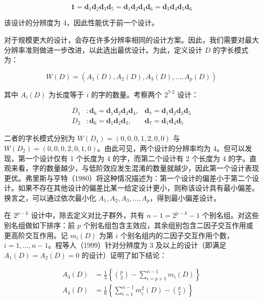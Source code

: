 \documentclass{ctexart}
\begin{document}
\begin{equation*}
\boldsymbol{1}=\boldsymbol{d}_1\boldsymbol{d}_2\boldsymbol{d}_3\boldsymbol{d}_5=\boldsymbol{d}_1\boldsymbol{d}_2\boldsymbol{d}_4\boldsymbol{d}_6=\boldsymbol{d}_3\boldsymbol{d}_4\boldsymbol{d}_5\boldsymbol{d}_6
\end{equation*}

该设计的分辨度为 4，因此性能优于前一个设计。

对于规模更大的设计，会存在许多分辨率相同的设计方案。因此，我们需要对最大分辨率准则做进一步改进，以此选出最优设计。为此，定义设计 $D$ 的字长模式为：

\begin{equation*}
W(D)=(A_1(D),A_2(D),A_3(D),\dots,A_p(D))
\tag{8.4}
\end{equation*}

其中 $A_i(D)$ 为长度等于 $i$ 的字的数量。考察两个 $2^{7‑2}$ 设计：

\begin{align*}
D_1&:\boldsymbol{d}_6=\boldsymbol{d}_1\boldsymbol{d}_2\boldsymbol{d}_3\boldsymbol{d}_4,&\boldsymbol{d}_7=\boldsymbol{d}_1\boldsymbol{d}_2\boldsymbol{d}_3\boldsymbol{d}_5\\
D_2&:\boldsymbol{d}_6=\boldsymbol{d}_1\boldsymbol{d}_2\boldsymbol{d}_3,&\boldsymbol{d}_7=\boldsymbol{d}_1\boldsymbol{d}_4\boldsymbol{d}_5\tag{8.5}
\end{align*}

二者的字长模式分别为 $W(D_1)=(0,0,0,1,2,0,0)$ 与 $W(D_2)=(0,0,0,2,0,1,0)$。由此可见，两个设计的分辨率均为 4。但可以发现，第一个设计仅有 1 个长度为 4 的字，而第二个设计有 2 个长度为 4 的字。直观来看，字的数量越少，与低阶效应发生混淆的数量就越少，因此第一个设计表现更优。弗里斯与亨特（1980）将这种情况描述为：第一个设计的偏差小于第二个设计。如果不存在其他设计的偏差比某一给定设计更小，则称该设计具有最小偏差。换言之，可以通过依次最小化 $A_1,A_2,A_3,\dots,A_p$，得到最小偏差设计。

在 $2^{p-k}$ 设计中，除去定义对比子群外，共有 $n-1=2^{p-k}-1$ 个别名组。对这些别名组做如下排序：前 $p$ 个别名组包含主效应，其余组别包含二因子交互作用或更高阶交互作用。记 $m_i(D)$ 为第 $i$ 个别名组内的二因子交互作用个数，$i=1,\dots,n-1$。程等人（1999）针对分辨度为 3 及以上的设计（即满足 $A_1(D)=A_2(D)=0$ 的设计）证明了如下结论：

\begin{align*}
A_3(D)&=\frac13\left\{\binom{p}{2}-\sum_{i=p+1}^{n-1}m_i(D)\right\}\\
A_4(D)&=\frac16\left\{\sum_{i=1}^{n-1}m_i^2(D)-\binom{p}{2}\right\}
\end{align*}
\end{document}
